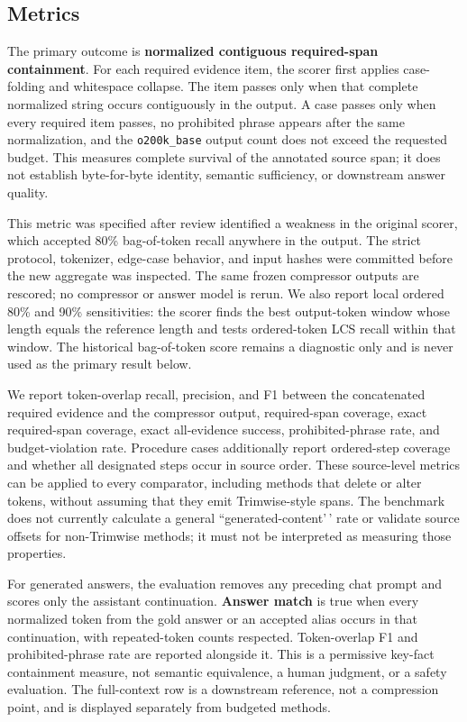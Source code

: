 \documentclass[
]{article}
\begin{document}
\subsection{Metrics}\label{metrics}

The primary outcome is \textbf{normalized contiguous required-span
containment}. For each required evidence item, the scorer first applies
case-folding and whitespace collapse. The item passes only when that
complete normalized string occurs contiguously in the output. A case
passes only when every required item passes, no prohibited phrase appears
after the same normalization, and the \texttt{o200k\_base} output count
does not exceed the requested budget. This measures complete survival of
the annotated source span; it does not establish byte-for-byte identity,
semantic sufficiency, or downstream answer quality.

This metric was specified after review identified a weakness in the
original scorer, which accepted 80\% bag-of-token recall anywhere
in the output. The strict protocol, tokenizer, edge-case behavior, and
input hashes were committed before the new aggregate was inspected. The
same frozen compressor outputs are rescored; no compressor or answer
model is rerun. We also report local ordered 80\% and 90\% sensitivities:
the scorer finds the best output-token window whose length equals the
reference length and tests ordered-token LCS recall within that window.
The historical bag-of-token score remains a diagnostic only and is never used as
the primary result below.

We report token-overlap recall, precision, and F1 between the
concatenated required evidence and the compressor output, required-span
coverage, exact required-span coverage, exact all-evidence success,
prohibited-phrase rate, and budget-violation rate. Procedure cases
additionally report ordered-step coverage and whether all designated
steps occur in source order. These source-level metrics can be applied
to every comparator, including methods that delete or alter tokens,
without assuming that they emit Trimwise-style spans. The benchmark does
not currently calculate a general ``generated-content'\,' rate or
validate source offsets for non-Trimwise methods; it must not be
interpreted as measuring those properties.

For generated answers, the evaluation removes any preceding chat prompt and
scores only the assistant continuation. \textbf{Answer match} is true
when every normalized token from the gold answer or an accepted alias
occurs in that continuation, with repeated-token counts respected.
Token-overlap F1 and prohibited-phrase rate are reported alongside it.
This is a permissive key-fact containment measure, not semantic
equivalence, a human judgment, or a safety evaluation. The full-context
row is a downstream reference, not a compression point, and is displayed
separately from budgeted methods.
\end{document}
